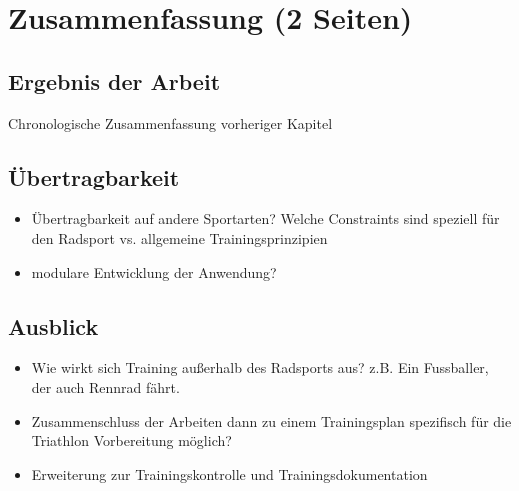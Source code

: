 \chapter{Zusammenfassung (2 Seiten)}
\label{sec:zusammenfassung}
\section{Ergebnis der Arbeit}
\label{sec:zusammenfassung:ergebnis}
Chronologische Zusammenfassung vorheriger Kapitel

\section{Übertragbarkeit}
\begin{itemize}
    \item Übertragbarkeit auf andere Sportarten? Welche Constraints sind speziell für den Radsport vs. allgemeine Trainingsprinzipien
    \item modulare Entwicklung der Anwendung?
\end{itemize}

\section{Ausblick}
\label{sec:zusammenfassung:ausblick}
\begin{itemize}
    \item Wie wirkt sich Training außerhalb des Radsports aus? z.B. Ein Fussballer, der auch Rennrad fährt.
    \item Zusammenschluss der Arbeiten dann zu einem Trainingsplan spezifisch für die Triathlon Vorbereitung möglich?
    \item Erweiterung zur Trainingskontrolle und Trainingsdokumentation
\end{itemize}
